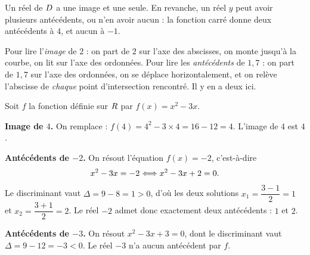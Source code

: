 \begin{remarque}
Un réel de $D$ a une image et une seule. En revanche, un réel $y$ peut
avoir plusieurs antécédents, ou n'en avoir aucun : la fonction carré donne
deux antécédents à $4$, et aucun à $-1$.
\end{remarque}

\begin{visualisation}
\begin{center}
\end{center}

\vspace{0.2em}
\noindent
Pour lire l'\emph{image} de $2$ : on part de $2$ sur l'axe des abscisses, on
monte jusqu'à la courbe, on lit sur l'axe des ordonnées. Pour lire les
\emph{antécédents} de $1{,}7$ : on part de $1{,}7$ sur l'axe des ordonnées,
on se déplace horizontalement, et on relève l'abscisse de \emph{chaque} point
d'intersection rencontré. Il y en a deux ici.
\end{visualisation}

\begin{exemple}
Soit $f$ la fonction définie sur $R$ par $f(x) = x^{2} - 3x$.

\textbf{Image de $4$.} On remplace : $f(4) = 4^{2} - 3 \times 4 = 16 - 12 = 4$.
L'image de $4$ est $4$.

\textbf{Antécédents de $-2$.} On résout l'équation $f(x) = -2$, c'est-à-dire
\[
  x^{2} - 3x = -2
  \Longleftrightarrow x^{2} - 3x + 2 = 0 .
\]
Le discriminant vaut $\Delta = 9 - 8 = 1 > 0$, d'où les deux solutions
$x_{1} = \dfrac{3-1}{2} = 1$ et $x_{2} = \dfrac{3+1}{2} = 2$. Le réel $-2$
admet donc exactement deux antécédents : $1$ et $2$.

\textbf{Antécédents de $-3$.} On résout $x^{2} - 3x + 3 = 0$, dont le
discriminant vaut $\Delta = 9 - 12 = -3 < 0$. Le réel $-3$ n'a aucun
antécédent par $f$.
\end{exemple}

